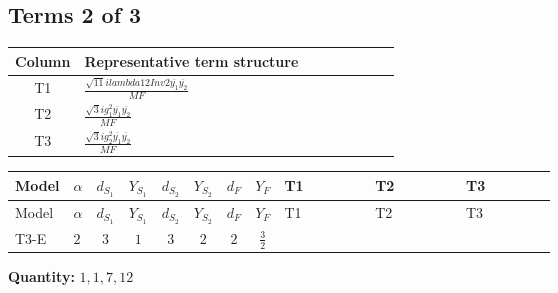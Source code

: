 \documentclass[8pt]{article}
\begin{document}
\begin{landscape}
\subsection*{Terms 2 of 3}
\begin{center}
\begin{tabular}{@{}c >{\raggedright\arraybackslash}p{0.82\linewidth}@{}}
\toprule
Column & Representative term structure \\
\midrule
T1 & \(\displaystyle \frac{\sqrt{11} i lambda12Inv2 \overline{y_{1}} \overline{y_{2}}}{MF}\) \\
\midrule
T2 & \(\displaystyle \frac{\sqrt{3} i g_{1}^{2} \overline{y_{1}} \overline{y_{2}}}{MF}\) \\
\midrule
T3 & \(\displaystyle \frac{\sqrt{3} i g_{2}^{2} \overline{y_{1}} \overline{y_{2}}}{MF}\) \\
\midrule
\bottomrule
\end{tabular}
\end{center}
\smallskip
\tiny
\begin{longtable}{@{}llcccccc >{\raggedright\arraybackslash}p{0.21\linewidth} >{\raggedright\arraybackslash}p{0.21\linewidth} >{\raggedright\arraybackslash}p{0.21\linewidth}@{}}
\toprule
Model & $\alpha$ & $d_{S_1}$ & $Y_{S_1}$ & $d_{S_2}$ & $Y_{S_2}$ & $d_F$ & $Y_F$ & T1 & T2 & T3 \\
\midrule
\endfirsthead
\toprule
Model & $\alpha$ & $d_{S_1}$ & $Y_{S_1}$ & $d_{S_2}$ & $Y_{S_2}$ & $d_F$ & $Y_F$ & T1 & T2 & T3 \\
\midrule
\endhead
T3-E & $2$ & $3$ & $1$ & $3$ & $2$ & $2$ & $\frac{3}{2}$ & \scriptsize\adjustbox{max width=\linewidth}{$\begin{gathered} \frac{3 \sqrt{11} i lambda12Inv2 \overline{y_{1}} \overline{y_{2}}}{22 MF}\end{gathered}$} & \scriptsize\adjustbox{max width=\linewidth}{$\begin{gathered} \frac{9 \sqrt{3} i g_{1}^{2} \overline{y_{1}} \overline{y_{2}}}{8 MF}\end{gathered}$} & \scriptsize\adjustbox{max width=\linewidth}{$\begin{gathered} \frac{49 \sqrt{3} i g_{2}^{2} \overline{y_{1}} \overline{y_{2}}}{24 MF}\end{gathered}$} \\
\midrule
\bottomrule
\end{longtable}
\clearpage
\noindent\textbf{Quantity: }$\mathrm{1,1,7,12}$\par\smallskip

\end{landscape}
\end{document}
